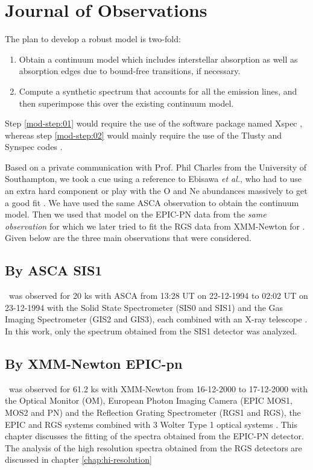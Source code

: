 		\section{Journal of Observations} \label{continuum:obs}
			The plan to develop a robust model is two-fold:
			\begin{enumerate}
				\item Obtain a continuum model which includes interstellar absorption as well as absorption edges due to bound-free transitions, if necessary. \label{mod-step:01}
				\item Compute a synthetic spectrum that accounts for all the emission lines, and then superimpose this over the existing continuum model. \label{mod-step:02}
			\end{enumerate}
			
			Step \ref{mod-step:01} would require the use of the software package named Xspec \cite{xspecManualv12_9_1}, whereas step \ref{mod-step:02} would mainly require the use of the Tlusty and Synspec codes \cite{tlustymanualI}.

			Based on a private communication with Prof. Phil Charles from the University of Southampton, we took a cue using a reference to Ebisawa \emph{et al.}, who had to use an extra hard component or play with the O and Ne abundances massively to get a good fit \cite{ebisawa1996}. We have used the same ASCA observation to obtain the continuum model. Then we used that model on the EPIC-PN data from the \emph{same observation} for which we later tried to fit the RGS data from XMM-Newton for \mrvel. Given below are the three main observations that were considered.
			
			\subsection{By ASCA SIS1} \label{continuum:obs:asca}
				\mrvel~was observed for 20 ks with ASCA from 13:28 UT on 22-12-1994 to 02:02 UT on 23-12-1994 with the Solid State Spectrometer (SIS0 and SIS1) and the Gas Imaging Spectrometer (GIS2 and GIS3), each combined with an X-ray telescope \cite{ebisawa1996}. In this work, only the spectrum obtained from the SIS1 detector was analyzed.
				
			\subsection{By XMM-Newton EPIC-pn} \label{continuum:obs:xmm}
				\mrvel~was observed for 61.2 ks with XMM-Newton from 16-12-2000 to 17-12-2000 with the Optical Monitor (OM), European Photon Imaging Camera (EPIC MOS1, MOS2 and PN) and the Reflection Grating Spectrometer (RGS1 and RGS), the EPIC and RGS systems combined with 3 Wolter Type 1 optical systems \cite{motch2002}. This chapter discusses the fitting of the spectra obtained from the EPIC-PN detector. The analysis of the high resolution spectra obtained from the RGS detectors are discussed in chapter \ref{chap:hi-resolution}
		
